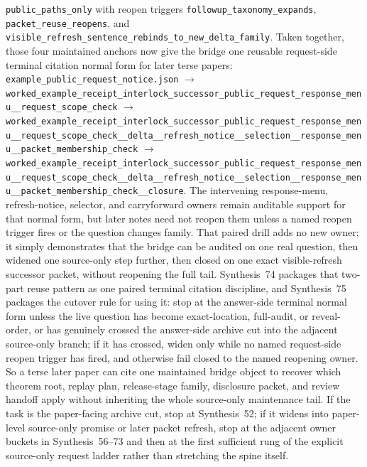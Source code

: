 \documentclass[11pt]{article}
\begin{document}
\texttt{public\_paths\_only} with reopen triggers \texttt{followup\_taxonomy\_expands}, \texttt{packet\_reuse\_reopens}, and \texttt{visible\_refresh\_sentence\_rebinds\_to\_new\_delta\_family}. Taken together, those four maintained anchors now give the bridge one reusable request-side terminal citation normal form for later terse papers: \nolinkurl{example_public_request_notice.json} $\to$ \texttt{worked\_example\_receipt\_interlock\_successor\_public\_request\_response\_menu\_\_request\_scope\_check} $\to$ \texttt{worked\_example\_receipt\_interlock\_successor\_public\_request\_response\_menu\_\_request\_scope\_check\_\_delta\_\_refresh\_notice\_\_selection\_\_response\_menu\_\_packet\_membership\_check} $\to$ \texttt{worked\_example\_receipt\_interlock\_successor\_public\_request\_response\_menu\_\_request\_scope\_check\_\_delta\_\_refresh\_notice\_\_selection\_\_response\_menu\_\_packet\_membership\_check\_\_closure}. The intervening response-menu, refresh-notice, selector, and carryforward owners remain auditable support for that normal form, but later notes need not reopen them unless a named reopen trigger fires or the question changes family. That paired drill adds no new owner; it simply demonstrates that the bridge can be audited on one real question, then widened one source-only step further, then closed on one exact visible-refresh successor packet, without reopening the full tail. Synthesis~74 packages that two-part reuse pattern as one paired terminal citation discipline, and Synthesis~75 packages the cutover rule for using it: stop at the answer-side terminal normal form unless the live question has become exact-location, full-audit, or reveal-order, or has genuinely crossed the answer-side archive cut into the adjacent source-only branch; if it has crossed, widen only while no named request-side reopen trigger has fired, and otherwise fail closed to the named reopening owner.\cite{series:pairedterminalcitationdiscipline,series:pairedterminalcutoverrules}
So a terse later paper can cite one maintained bridge object to recover which theorem root, replay plan, release-stage family, disclosure packet, and review handoff apply without inheriting the whole source-only maintenance tail. If the task is the paper-facing archive cut, stop at Synthesis~52; if it widens into paper-level source-only promise or later packet refresh, stop at the adjacent owner buckets in Synthesis~56--73 and then at the first sufficient rung of the explicit source-only request ladder rather than stretching the spine itself.\cite{series:publicrequestcontracts,series:requestableevidenceclasses,series:requestfulfillmentcertificates,series:publicrequeststatusenvelopes,series:publicrequestcarryforward,series:publicrequestnotices,series:publicrequestnoticenormalforms,series:publicrequestnoticeselections,series:publicrequestresponsemenus,series:publicrequestresponsepackets,series:publicrequestresponsepacketcarryforward,series:publicrequestresponsepacketdeltas,series:publicrequestresponsepacketrefreshnotices,series:publicrequestresponsepacketrefreshnoticenormalforms,series:publicrequestresponsepacketrefreshnoticeselections,series:publicrequestresponsepacketrefreshresponsemenus,series:publicrequestresponsepacketrefreshresponsepackets,series:publicrequestresponsepacketrefreshresponsepacketclosureverdicts}
\end{document}
